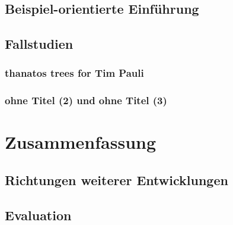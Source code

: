 \documentclass[12pt,a4paper,ngerman]{article}
\begin{document}

\subsection{Beispiel-orientierte Einführung}


\subsection{Fallstudien}

\subsubsection{thanatos trees for Tim Pauli}

\subsubsection{ohne Titel (2) und ohne Titel (3)}

\section{Zusammenfassung}

\subsection{Richtungen weiterer Entwicklungen}

\subsection{Evaluation}

\newpage

\appendix

\printbibliography

\newpage

\listoffigures

\newpage
\end{document}
